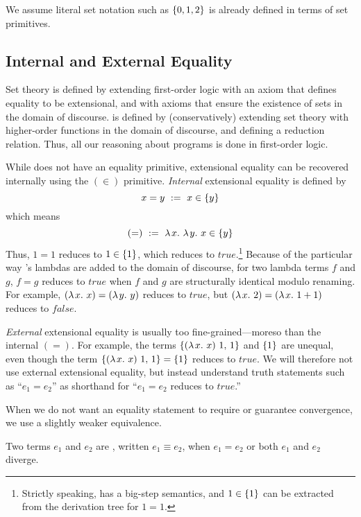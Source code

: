 \documentclass[preprint]{sigplanconf}
\begin{document}
We assume literal set notation such as $\{{0,1,2}\}$ is already defined in terms of set primitives.

\subsection{Internal and External Equality}

Set theory is defined by extending first-order logic with an axiom that defines equality to be extensional, and with axioms that ensure the existence of sets in the domain of discourse.
\lzfclang is defined by (conservatively) extending set theory with higher-order functions in the domain of discourse, and defining a reduction relation.
Thus, all our reasoning about \lzfclang programs is done in first-order logic.

While \lzfclang does not have an equality primitive, extensional equality can be recovered internally using the $(\in)$ primitive.
\emph{Internal} extensional equality is defined by
\begin{equation}
	x = y \ := \ x \in \{{y}\}
\end{equation}
which means
\begin{equation}
	(=) \ := \ \lambda\mspace{2mu}{x}\ldotp\,\lambda\mspace{2mu}{y}\ldotp\,{x \in \{{y}\}}
\end{equation}
Thus, $1 = 1$ reduces to $1 \in \{{1}\}$, which reduces to $true$.\footnote{Strictly speaking, \lzfclang has a big-step semantics, and $1 \in \{{1}\}$ can be extracted from the derivation tree for $1 = 1$.}
Because of the particular way \lzfclang's lambdas are added to the domain of discourse, for two lambda terms $f$ and $g$, $f = g$ reduces to $true$ when $f$ and $g$ are structurally identical modulo renaming.
For example, $(\lambda\mspace{2mu}{x}\ldotp\,{x}) = (\lambda\mspace{2mu}{y}\ldotp\,{y})$ reduces to $true$, but $(\lambda\mspace{2mu}{x}\ldotp\,{2}) = (\lambda\mspace{2mu}{x}\ldotp\,{1+1})$ reduces to $false$.

\emph{External} extensional equality is usually too fine-grained---moreso than the internal $(=)$.
For example, the terms $\{{(\lambda\mspace{2mu}{x}\ldotp\,{x})~1,\,1}\}$ and $\{{1}\}$ are unequal, even though the term $\{{(\lambda\mspace{2mu}{x}\ldotp\,{x})~1,\,1}\} = \{{1}\}$ reduces to $true$.
We will therefore not use external extensional equality, but instead understand truth statements such as ``$\mathit{e_1} = \mathit{e_2}$'' as shorthand for ``$\mathit{e_1} = \mathit{e_2}$ reduces to $true$.''

When we do not want an equality statement to require or guarantee convergence, we use a slightly weaker equivalence.

\begin{definition}
Two \lzfclang terms $\mathit{e_1}$ and $\mathit{e_2}$ are , written $\mathit{e_1} \equiv \mathit{e_2}$, when $\mathit{e_1} = \mathit{e_2}$ or both $\mathit{e_1}$ and $\mathit{e_2}$ diverge.
\end{definition}
\end{document}
